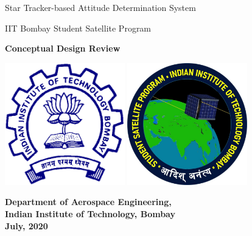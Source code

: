 \documentclass[../../main.tex]{subfiles}
\begin{document}
\begin{titlepage}
\sffamily
\centering
\Large

{\huge 
\bfseries{Star Tracker-based Attitude Determination System

\vspace{40pt}

IIT Bombay Student Satellite Program}
}

\vspace{60pt}

{\LARGE \bfseries{Conceptual Design Review}}

\vspace{60pt}



\begin{center}
    \includegraphics[width=0.39\textwidth]{Figures/Foreword/iitb_logo.png}
    \hspace{15pt}
    \includegraphics[width=0.39\textwidth]{Figures/Foreword/iitb_ssp_logo.jpg}
\end{center} 



\vspace{60pt}
\bfseries{Department of Aerospace Engineering, \\ \bigskip Indian Institute of Technology, Bombay\\ \bigskip
July, 2020}
\end{titlepage}
\end{document}

